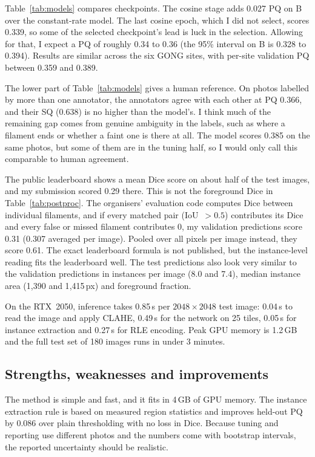 \documentclass[sigconf]{acmart}
\begin{document}
Table~\ref{tab:models} compares checkpoints. The cosine stage adds 0.027 PQ on B over the constant-rate model. The last cosine epoch, which I did not select, scores 0.339, so some of the selected checkpoint's lead is luck in the selection. Allowing for that, I expect a PQ of roughly 0.34 to 0.36 (the 95\% interval on B is 0.328 to 0.394). Results are similar across the six GONG sites, with per-site validation PQ between 0.359 and 0.389.

The lower part of Table~\ref{tab:models} gives a human reference. On photos labelled by more than one annotator, the annotators agree with each other at PQ 0.366, and their SQ (0.638) is no higher than the model's. I think much of the remaining gap comes from genuine ambiguity in the labels, such as where a filament ends or whether a faint one is there at all. The model scores 0.385 on the same photos, but some of them are in the tuning half, so I would only call this comparable to human agreement.

The public leaderboard shows a mean Dice score on about half of the test images, and my submission scored 0.29 there. This is not the foreground Dice in Table~\ref{tab:postproc}. The organisers' evaluation code computes Dice between individual filaments, and if every matched pair (IoU~$>0.5$) contributes its Dice and every false or missed filament contributes 0, my validation predictions score 0.31 (0.307 averaged per image). Pooled over all pixels per image instead, they score 0.61. The exact leaderboard formula is not published, but the instance-level reading fits the leaderboard well. The test predictions also look very similar to the validation predictions in instances per image (8.0 and 7.4), median instance area (1{,}390 and 1{,}415\,px) and foreground fraction.

On the RTX~2050, inference takes 0.85\,s per $2048\times2048$ test image: 0.04\,s to read the image and apply CLAHE, 0.49\,s for the network on 25 tiles, 0.05\,s for instance extraction and 0.27\,s for RLE encoding. Peak GPU memory is 1.2\,GB and the full test set of 180 images runs in under 3 minutes.

\subsection{Strengths, weaknesses and improvements}
The method is simple and fast, and it fits in 4\,GB of GPU memory. The instance extraction rule is based on measured region statistics and improves held-out PQ by 0.086 over plain thresholding with no loss in Dice. Because tuning and reporting use different photos and the numbers come with bootstrap intervals, the reported uncertainty should be realistic.
\end{document}

